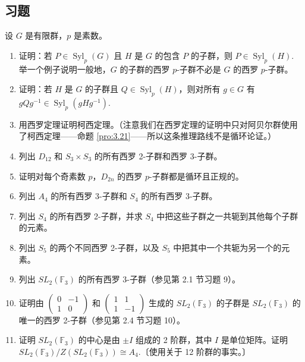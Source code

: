 \subsection*{习题}
设 \(G\) 是有限群，\(p\) 是素数。

\begin{enumerate}
\item 证明：若 \(P \in \operatorname{Syl}_p(G)\) 且 \(H\) 是 \(G\) 的包含 \(P\) 的子群，则 \(P \in \operatorname{Syl}_p(H)\). 举一个例子说明一般地，\(G\) 的子群的西罗 \(p\)-子群不必是 \(G\) 的西罗 \(p\)-子群。

\item 证明：若 \(H\) 是 \(G\) 的子群且 \(Q \in \operatorname{Syl}_p(H)\)，则对所有 \(g \in G\) 有 \(gQg^{-1} \in \operatorname{Syl}_p(gHg^{-1})\).

\item 用西罗定理证明柯西定理。（注意我们在西罗定理的证明中只对阿贝尔群使用了柯西定理——命题 \ref{pro:3.21}——所以这条推理路线不是循环论证。）

\item 列出 \(D_{12}\) 和 \(S_3 \times S_3\) 的所有西罗 2-子群和西罗 3-子群。

\item 证明对每个奇素数 \(p\)，\(D_{2n}\) 的西罗 \(p\)-子群都是循环且正规的。

\item 列出 \(A_4\) 的所有西罗 3-子群和 \(S_4\) 的所有西罗 3-子群。

\item 列出 \(S_4\) 的所有西罗 2-子群，并求 \(S_4\) 中把这些子群之一共轭到其他每个子群的元素。

\item 列出 \(S_5\) 的两个不同西罗 2-子群，以及 \(S_5\) 中把其中一个共轭为另一个的元素。

\item 列出 \(SL_2(\mathbb{F}_3)\) 的所有西罗 3-子群（参见第 2.1 节习题 9）。

\item 证明由 \(\begin{pmatrix} 0 & -1 \\ 1 & 0 \end{pmatrix}\) 和 \(\begin{pmatrix} 1 & 1 \\ 1 & -1 \end{pmatrix}\) 生成的 \(SL_2(\mathbb{F}_3)\) 的子群是 \(SL_2(\mathbb{F}_3)\) 的唯一的西罗 2-子群（参见第 2.4 节习题 10）。

\item 证明 \(SL_2(\mathbb{F}_3)\) 的中心是由 \(\pm I\) 组成的 2 阶群，其中 \(I\) 是单位矩阵。证明 \(SL_2(\mathbb{F}_3)/Z(SL_2(\mathbb{F}_3)) \cong A_4\).〔使用关于 12 阶群的事实。〕


\end{enumerate}
